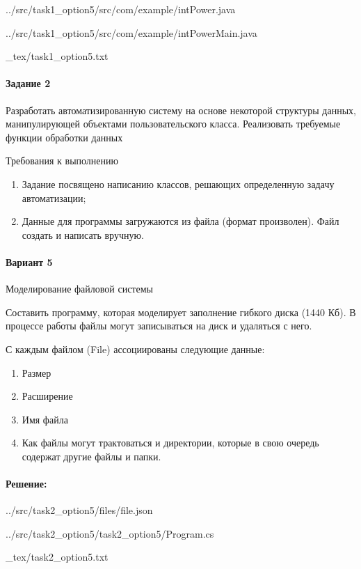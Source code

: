 
{../src/task1_option5/src/com/example/intPower.java}


{../src/task1_option5/src/com/example/intPowerMain.java}

\newpage


{_tex/task1_option5.txt}

\newpage


\paragraph{Задание 2} \hspace{0pt}

Разработать автоматизированную систему на основе некоторой структуры данных,
манипулирующей объектами пользовательского класса.
Реализовать требуемые функции обработки данных

Требования к выполнению
\begin{enumerate}
    \item Задание посвящено написанию классов,
    решающих определенную задачу автоматизации;
    \item Данные для программы загружаются из файла (формат произволен).
    Файл создать и написать вручную.
\end{enumerate}

\paragraph{Вариант 5} \hspace{0pt}

Моделирование файловой системы

Составить программу, которая моделирует заполнение гибкого диска (1440 Кб). В процессе
работы файлы могут записываться на диск и удаляться с него.

С каждым файлом (File) ассоциированы следующие данные:

\begin{enumerate}
    \item Размер
    \item Расширение
    \item Имя файла
    \item Как файлы могут трактоваться и директории,
    которые в свою очередь содержат другие файлы и папки.
\end{enumerate}

\paragraph {Решение:} \hspace{0pt}


{../src/task2_option5/files/file.json}


{../src/task2_option5/task2_option5/Program.cs}

\newpage


{_tex/task2_option5.txt}
